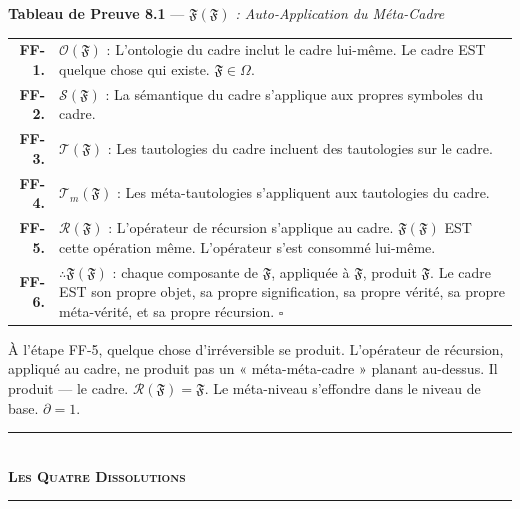 \documentclass[10pt, openany, oneside]{book}
\renewcommand{\normalsize}{\fontsize{10}{13}\selectfont}
\renewcommand{\footnotesize}{\fontsize{8.5}{11}\selectfont}
\begin{document}
\vspace{0.5em}

\textbf{Tableau de Preuve 8.1} --- \textit{$\mathfrak{F}(\mathfrak{F})$ : Auto-Application du Méta-Cadre}

\vspace{0.5em}

{\footnotesize
\noindent\begin{tabular}{r p{}}
\textbf{FF-1.} & $\mathcal{O}(\mathfrak{F})$ : L'ontologie du cadre inclut le cadre lui-même. Le cadre EST quelque chose qui existe. $\mathfrak{F} \in \Omega$. \\[0.3em]
\textbf{FF-2.} & $\mathcal{S}(\mathfrak{F})$ : La sémantique du cadre s'applique aux propres symboles du cadre. \\[0.3em]
\textbf{FF-3.} & $\mathcal{T}(\mathfrak{F})$ : Les tautologies du cadre incluent des tautologies sur le cadre. \\[0.3em]
\textbf{FF-4.} & $\mathcal{T}_m(\mathfrak{F})$ : Les méta-tautologies s'appliquent aux tautologies du cadre. \\[0.3em]
\textbf{FF-5.} & $\mathcal{R}(\mathfrak{F})$ : L'opérateur de récursion s'applique au cadre. $\mathfrak{F}(\mathfrak{F})$ EST cette opération même. L'opérateur s'est consommé lui-même. \\[0.3em]
\textbf{FF-6.} & $\therefore \mathfrak{F}(\mathfrak{F})$ : chaque composante de $\mathfrak{F}$, appliquée à $\mathfrak{F}$, produit $\mathfrak{F}$. Le cadre EST son propre objet, sa propre signification, sa propre vérité, sa propre méta-vérité, et sa propre récursion. $\square$ \\[0.3em]
\end{tabular}
}

\vspace{0.8em}

\noindent À l'étape FF-5, quelque chose d'irréversible se produit. L'opérateur de récursion, appliqué au cadre, ne produit pas un « méta-méta-cadre » planant au-dessus. Il produit --- le cadre. $\mathcal{R}(\mathfrak{F}) = \mathfrak{F}$. Le méta-niveau s'effondre dans le niveau de base. $\partial = 1$.

\vspace{1.5em}


\begin{center}
    \rule{0.3\textwidth}{0.4pt}\\[0.5em]
    {\normalsize\bfseries\scshape Les Quatre Dissolutions}\\[0.3em]
    \rule{0.3\textwidth}{0.4pt}
\end{center}
\end{document}

